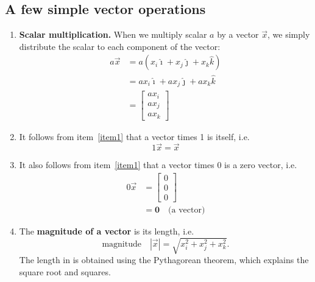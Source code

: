 \documentclass{tufte-handout}
\begin{document}
\subsection{A few simple vector operations}
\begin{enumerate}
\item\label{item1} \textbf{Scalar multiplication.} When we multiply scalar $a$ by a vector $\vec{x}$, we simply distribute the scalar to each component of the vector:
\begin{align}
a \vec{x} &= a (x_i \hat{\imath} + x_j \hat{\jmath} + x_k \hat{k})  \\
&= ax_i \hat{\imath} + ax_j \hat{\jmath} + ax_k \hat{k} \\
&= \begin{bmatrix} ax_i \\ ax_j \\ ax_k \end{bmatrix}
\end{align}
\item It follows from item~\ref{item1} that a vector times 1 is itself, i.e.
\begin{equation}
1 \vec{x} = \vec{x}
\end{equation}
\item It also follows from item~\ref{item1} that a vector times 0 is a zero vector, i.e.
\begin{align}
0 \vec{x} &= \begin{bmatrix} 0 \\ 0 \\ 0 \end{bmatrix} \\
&= \mathbf{0}\quad\text{(a vector)} 
\end{align}
\item The \textbf{magnitude of a vector} is its length, i.e.
\begin{equation}
\text{magnitude}\quad | \vec{x} | = \sqrt{x_i^2 + x_j^2 + x_k^2}.
\label{eq:magnitude}
\end{equation}
The length in  is obtained using the Pythagorean theorem, which explains the square root and squares. 


\end{enumerate}
\end{document}

